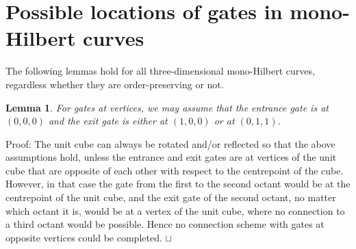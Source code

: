 \documentclass[11pt,a4paper]{article}
\newtheorem{lemma}{Lemma}
\newenvironment{proof}{Proof:}{\qed}
\def\squareforqed{\hbox{\rlap{$\sqcap$}$\sqcup$}}
\def\qed{\ifmmode\squareforqed\else{\unskip\nobreak\hfil
\penalty50\hskip1em\null\nobreak\hfil\squareforqed
\parfillskip=0pt\finalhyphendemerits=0\endgraf}\fi}
\begin{document}
\break
\appendix

\section{Possible locations of gates in mono-Hilbert curves}

The following lemmas hold for all three-dimensional mono-Hilbert curves, regardless whether they are order-preserving or not.

\begin{lemma}\label{lem:vertex-vertex-gates}
For gates at vertices, we may assume that the entrance gate is at $(0,0,0)$ and the exit gate is either at $(1,0,0)$ or at $(0,1,1)$.
\end{lemma}
\begin{proof}
The unit cube can always be rotated and/or reflected so that the above assumptions hold, unless the entrance and exit gates are at vertices of the unit cube that are opposite of each other with respect to the centrepoint of the cube. However, in that case the gate from the first to the second octant would be at the centrepoint of the unit cube, and the exit gate of the second octant, no matter which octant it is, would be at a vertex of the unit cube, where no connection to a third octant would be possible. Hence no connection scheme with gates at opposite vertices could be completed.
\end{proof}
\end{document}
